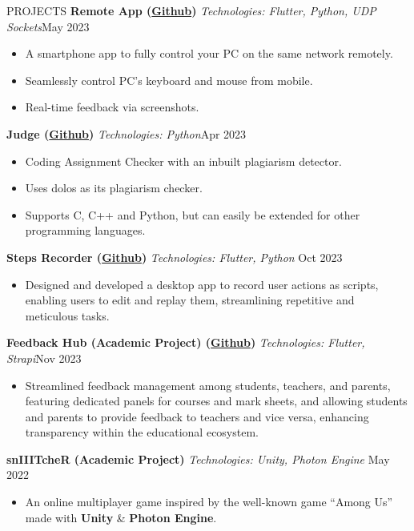 \documentclass{resume}
\begin{document}

\begin{rSection}{PROJECTS}
    \textbf{Remote App (\href{https://github.com/ShivanshuKGupta/remote}{Github})} \textit{Technologies: Flutter, Python, UDP Sockets}\hfill May 2023
    \begin{itemize}
        \itemsep -3pt {}
        \item A smartphone app to fully control your PC on the same network remotely.
        \item Seamlessly control PC's keyboard and mouse from mobile.
        \item Real-time feedback via screenshots.
    \end{itemize}

    \textbf{Judge (\href{https://github.com/ShivanshuKGupta/Judge}{Github})} \textit{Technologies: Python}\hfill Apr 2023
    \begin{itemize}
        \itemsep -3pt {}
        \item Coding Assignment Checker with an inbuilt plagiarism detector.
        \item Uses dolos as its plagiarism checker.
        \item Supports C, C++ and Python, but can easily be extended for other programming languages.

    \end{itemize}

    \textbf{Steps Recorder (\href{https://github.com/ShivanshuKGupta/Steps-Recorder}{Github})} \textit{Technologies: Flutter, Python} \hfill Oct 2023
    \begin{itemize}
        \itemsep -3pt {}
        \item Designed and developed a desktop app to record user actions as scripts, enabling users to edit and replay them, streamlining repetitive and meticulous tasks.
    \end{itemize}

    \textbf{Feedback Hub (Academic Project) (\href{https://github.com/ShivanshuKGupta/feedback_hub}{Github})} \textit{Technologies: Flutter, Strapi}\hfill Nov 2023
    \begin{itemize}
        \itemsep -3pt {}
        \item Streamlined feedback management among students, teachers, and parents, featuring dedicated panels for courses and mark sheets, and allowing students and parents to provide feedback to teachers and vice versa, enhancing transparency within the educational ecosystem.
    \end{itemize}

    \textbf{snIIITcheR (Academic Project)} \textit{Technologies: Unity, Photon Engine} \hfill May 2022
    \begin{itemize}
        \itemsep -3pt {}
        \item An online multiplayer game inspired by the well-known game “Among Us” made with \textbf{Unity} \& \textbf{Photon Engine}.
    \end{itemize}
\end{rSection}
\end{document}

